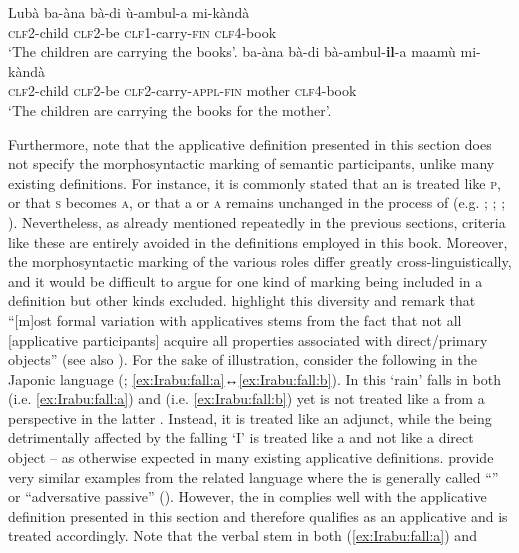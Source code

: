 \ea Lubà \citep[103]{de-kind:bostoen:2012}
\ea\label{ex:Luba:carry:a}
	\gll	ba-àna bà-di ù-ambul-a mi-kàndà \\
			\textsc{clf2}-child \textsc{clf2}-be \textsc{clf1}-carry-\textsc{fin} \textsc{clf4}-book \\
	\glt	‘The children are carrying the books’.
\ex\label{ex:Luba:carry:b}
	\gll	ba-àna bà-di bà-ambul-\textbf{il}-a maamù mi-kàndà \\
			\textsc{clf2}-child \textsc{clf2}-be \textsc{clf2}-carry-\textsc{appl-fin} mother \textsc{clf4}-book \\
	\glt	‘The children are carrying the books for the mother’.
	\z 
\z

Furthermore, note that the applicative definition presented in this section does not specify the morphosyntactic marking of semantic participants, unlike many existing definitions. For instance, it is commonly stated that an  is treated like \textsc{p}, or that \textsc{s} becomes \textsc{a}, or that a  or \textsc{a} remains unchanged in the process of  (e.g. \citealt[31]{dixon:2000}; \citealt[13f.]{dixon:aikhenvald:2000}; \citealt[412f.]{malchukov:2016}; \citealt[53]{zuniga:kittila:2019}). Nevertheless, as already mentioned repeatedly in the previous sections, criteria like these are entirely avoided in the definitions employed in this book. Moreover, the morphosyntactic marking of the various roles differ greatly cross-linguistically, and it would be difficult to argue for one kind of marking being included in a definition but other kinds excluded. \citet[63]{zuniga:kittila:2019} highlight this diversity and remark that “[m]ost formal variation with applicatives stems from the fact that not all [applicative participants] acquire all properties associated with direct/primary objects” (see also \citealt{beck:2009}). For the sake of illustration, consider the following  in the Japonic language  (; \ref{ex:Irabu:fall:a}↔\ref{ex:Irabu:fall:b}). In this  ‘rain’ falls in both  (i.e. \ref{ex:Irabu:fall:a}) and  (i.e. \ref{ex:Irabu:fall:b}) yet is not treated like a  from a  perspective in the latter . Instead, it is treated like an adjunct, while the  being detrimentally affected by the falling ‘I’ is treated like a  and not like a direct object -- as otherwise expected in many existing applicative definitions. \citet[776]{kishimoto:al:2015} provide very similar examples from the related language  where the  is generally called “” or “adversative passive” (\citealt[76ff., 244]{zuniga:kittila:2019}). However, the  in  complies well with the applicative definition presented in this section and therefore qualifies as an applicative  and is treated accordingly. Note that the verbal stem in both (\ref{ex:Irabu:fall:a}) and 